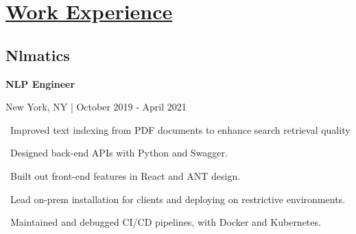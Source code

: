 \documentclass{article}
\begin{document}
\begin{minipage}[t]{0.45\textwidth\hspace{0in}}

    \section{\underline{Work Experience}}
        \vspace{-0.8em}
        \subsection{Nlmatics}
        \vspace{-0.5em}\hspace{0.1em}
        \mdseries\bfseries{NLP Engineer}
        \vspace{0.1em}
        
        \hspace{0.5em}\mdseries\textrm{New York, NY | October 2019 - April 2021}

        \vspace{-0.8em}
        \begin{minipage}[t]{3.75in\textwidth\hspace{0in}}
            \vspace{0.3em}
            \hspace{1em}\textasteriskcentered \, \mdseries\textrm{Improved text indexing from PDF documents to enhance search retrieval quality}
            
            \vspace{0.3em}
            \hspace{1em}\textasteriskcentered \, \mdseries\textrm{Designed back-end APIs with Python and Swagger.}

            \vspace{0.3em}
            \hspace{1em}\textasteriskcentered \, \mdseries\textrm{Built out front-end features in React and ANT design.}
            
            \vspace{0.3em}
            \hspace{1em}\textasteriskcentered \, \mdseries\textrm{Lead on-prem installation for clients and deploying on restrictive environments.}
            
            \vspace{0.3em}
            \hspace{1em}\textasteriskcentered \, \mdseries\textrm{Maintained and debugged CI/CD pipelines, with Docker and Kubernetes.}
        \end{minipage}


\end{minipage}
\end{document}
